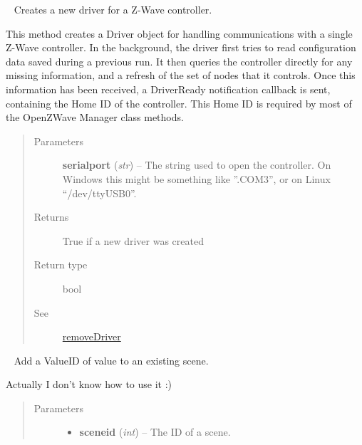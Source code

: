 \documentclass[letterpaper,10pt,english]{sphinxmanual}
\begin{document}
\begin{fulllineitems}
\begin{fulllineitems}
\end{fulllineitems}


\begin{fulllineitems}
\label{libopenzwave:libopenzwave.PyManager.addDriver}~\label{libopenzwave:adddriver}
Creates a new driver for a Z-Wave controller.

This method creates a Driver object for handling communications with a single
Z-Wave controller.  In the background, the driver first tries to read
configuration data saved during a previous run.  It then queries the controller
directly for any missing information, and a refresh of the set of nodes that
it controls.  Once this information has been received, a DriverReady
notification callback is sent, containing the Home ID of the controller.  This
Home ID is required by most of the OpenZWave Manager class methods.
\begin{quote}\begin{description}
\item[{Parameters}] \leavevmode
\textbf{serialport} (\emph{str}) -- The string used to open the controller.  On Windows this might be something like ''.COM3'', or on Linux ``/dev/ttyUSB0''.

\item[{Returns}] \leavevmode
True if a new driver was created

\item[{Return type}] \leavevmode
bool

\item[{See}] \leavevmode
{\hyperref[libopenzwave:removedriver]{removeDriver}}

\end{description}\end{quote}

\end{fulllineitems}


\begin{fulllineitems}
\label{libopenzwave:libopenzwave.PyManager.addSceneValue}~\label{libopenzwave:addscenevalue}
Add a ValueID of value to an existing scene.

Actually I don't know how to use it :)
\begin{quote}\begin{description}
\item[{Parameters}] \leavevmode\begin{itemize}
\item {} 
\textbf{sceneid} (\emph{int}) -- The ID of a scene.


\end{itemize}
\end{description}
\end{quote}
\end{fulllineitems}
\end{fulllineitems}
\end{document}
